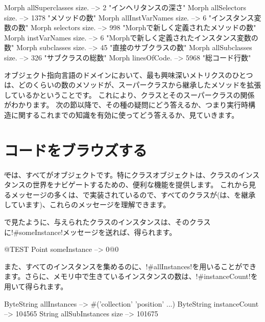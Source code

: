 \documentclass[a4paper,10pt,twoside]{book}
\begin{document}
\begin{code}{}
Morph allSuperclasses size.  -->       2 "インヘリタンスの深さ"
Morph allSelectors size.        --> 1378 "メソッドの数"
Morph allInstVarNames size. -->      6 "インスタンス変数の数"
Morph selectors size.             -->  998 "Morphで新しく定義されたメソッドの数"
Morph instVarNames size.     -->      6 "Morphで新しく定義されたインスタンス変数の数"
Morph subclasses size.          -->    45 "直接のサブクラスの数"
Morph allSubclasses size.      -->  326 "サブクラスの総数"
Morph linesOfCode.               --> 5968 "総コード行数"
\end{code}

オブジェクト指向言語のドメインにおいて、最も興味深いメトリクスのひとつは、どのくらいの数のメソッドが、スーパークラスから継承したメソッドを拡張しているかということです。
これにより、クラスとそのスーパークラスの関係がわかります。
次の節以降で、その種の疑問にどう答えるか、つまり実行時構造に関するこれまでの知識を有効に使ってどう答えるか、見ていきます。

\section{コードをブラウズする}

\st では、すべてがオブジェクトです。特にクラスオブジェクトは、クラスのインスタンスの世界をナビゲートするための、便利な機能を提供します。
これから見るメッセージの多くは、で実装されているので、すべてのクラスが(は、を継承しています)、これらのメッセージを理解できます。

で見たように、与えられたクラスのインスタンスは、そのクラスに\ct!#someInstance!メッセージを送れば、得られます。
\begin{code}{@TEST} %
Point someInstance --> 0@0
\end{code}

また、すべてのインスタンスを集めるのに、\ct!#allInstances!を用いることができます。さらに、メモリ中で生きているインスタンスの数は、\ct!#instanceCount!を用いて得られます。

\begin{code}{} %
ByteString allInstances        --> #('collection' 'position'  ...)
ByteString instanceCount    --> 104565
String allSubInstances size -->  101675
\end{code}
\end{document}
